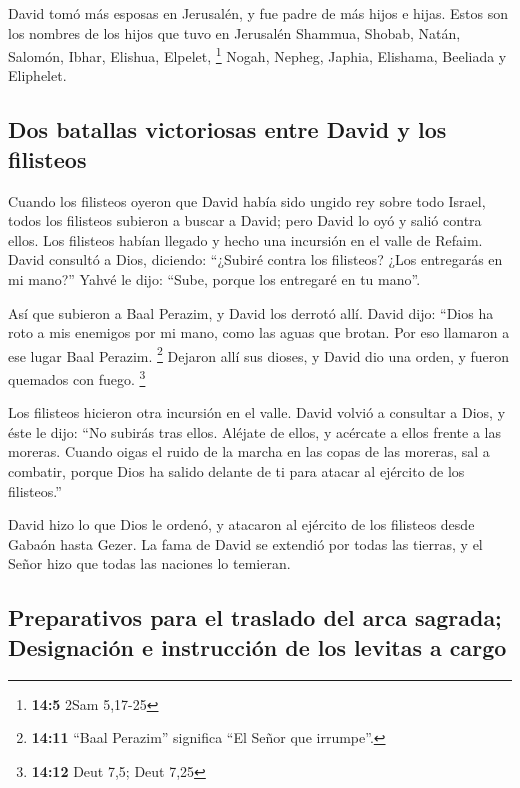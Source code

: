  David tomó más esposas en Jerusalén, y fue padre de más
hijos e hijas.  Estos son los nombres de los hijos que
tuvo en Jerusalén Shammua, Shobab, Natán, Salomón,  Ibhar,
Elishua, Elpelet, \footnote{\textbf{14:5} 2Sam 5,17-25} 
Nogah, Nepheg, Japhia,  Elishama, Beeliada y Eliphelet.

\hypertarget{dos-batallas-victoriosas-entre-david-y-los-filisteos}{%
\subsection{Dos batallas victoriosas entre David y los
filisteos}\label{dos-batallas-victoriosas-entre-david-y-los-filisteos}}

 Cuando los filisteos oyeron que David había sido ungido
rey sobre todo Israel, todos los filisteos subieron a buscar a David;
pero David lo oyó y salió contra ellos.  Los filisteos
habían llegado y hecho una incursión en el valle de Refaim.
 David consultó a Dios, diciendo: ``¿Subiré contra los
filisteos? ¿Los entregarás en mi mano?'' Yahvé le dijo: ``Sube, porque
los entregaré en tu mano''.

 Así que subieron a Baal Perazim, y David los derrotó
allí. David dijo: ``Dios ha roto a mis enemigos por mi mano, como las
aguas que brotan. Por eso llamaron a ese lugar Baal Perazim. \footnote{\textbf{14:11}
  ``Baal Perazim'' significa ``El Señor que irrumpe''.} 
Dejaron allí sus dioses, y David dio una orden, y fueron quemados con
fuego. \footnote{\textbf{14:12} Deut 7,5; Deut 7,25}

 Los filisteos hicieron otra incursión en el valle.
 David volvió a consultar a Dios, y éste le dijo: ``No
subirás tras ellos. Aléjate de ellos, y acércate a ellos frente a las
moreras.  Cuando oigas el ruido de la marcha en las copas
de las moreras, sal a combatir, porque Dios ha salido delante de ti para
atacar al ejército de los filisteos.''

 David hizo lo que Dios le ordenó, y atacaron al ejército
de los filisteos desde Gabaón hasta Gezer.  La fama de
David se extendió por todas las tierras, y el Señor hizo que todas las
naciones lo temieran.

\hypertarget{preparativos-para-el-traslado-del-arca-sagrada-designaciuxf3n-e-instrucciuxf3n-de-los-levitas-a-cargo}{%
\subsection{Preparativos para el traslado del arca sagrada; Designación
e instrucción de los levitas a
cargo}\label{preparativos-para-el-traslado-del-arca-sagrada-designaciuxf3n-e-instrucciuxf3n-de-los-levitas-a-cargo}}

